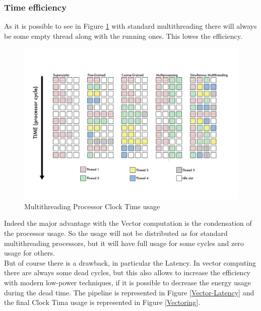 \subsubsection{Time efficiency}
As it is possible to see in Figure \ref{Multithreading} with standard multithreading there will always be some empty thread along with the running ones. This lowes the efficiency.
\begin{figure}[H]
    \centering
    \includegraphics[scale = 0.5]{Chapter_1/img/threads.png}
    \caption{Multithreading Processor Clock Time usage  \cite{L15-Krste}}
    \label{Multithreading}
\end{figure}

Indeed the major advantage with the Vector computation is the condensation of the processor usage. 
So the usage will not be distributed as for standard multithreading processors, but it will have full usage for some cycles and zero usage for others\cite{L15-Krste}.\\

But of course there is a drawback, in particular the Latency. In vector computing there are always some dead cycles, but this also allows to increase the efficiency with modern low-power techniques, if it is possible to decrease the energy usage during the dead time.
The pipeline is represented in Figure \ref{Vector-Latency} and the final Clock Tima usage is represented in Figure \ref{Vectoring}.


